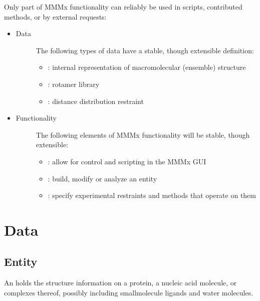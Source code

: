 \documentclass[letterpaper,10pt,english]{sphinxmanual}
\begin{document}
Only part of MMMx functionality can reliably be used in scripts, contributed methods, or by external requests:
\begin{itemize}
\item {} \begin{description}
\item[{Data}] \leavevmode
The following types of data have a stable, though extensible definition:
\begin{itemize}
\item {} 
: internal representation of macromolecular (ensemble) structure

\item {} 
: rotamer library

\item {} 
: distance distribution restraint

\end{itemize}

\end{description}

\item {} \begin{description}
\item[{Functionality}] \leavevmode
The following elements of MMMx functionality will be stable, though extensible:
\begin{itemize}
\item {} 
: allow for control and scripting in the MMMx GUI

\item {} 
: build, modify or analyze an entity

\item {} 
: specify experimental restraints and methods that operate on them

\end{itemize}

\end{description}

\end{itemize}


\chapter{Data}
\label{\detokenize{data:data}}\label{\detokenize{data::doc}}

\section{Entity}
\label{\detokenize{data:entity}}
An  holds the structure information on a protein, a nucleic acid molecule, or complexes thereof, possibly including small\sphinxhyphen{}molecule ligands and water molecules.
\end{document}
